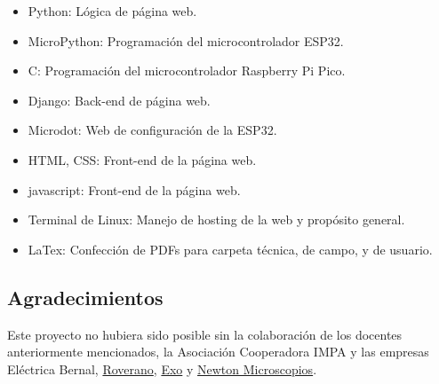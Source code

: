 \begin{itemize}
\item Python: Lógica de página web.
\item MicroPython: Programación del microcontrolador ESP32.
\item C: Programación del microcontrolador Raspberry Pi Pico.
\item Django: Back-end de página web.
\item Microdot: Web de configuración de la ESP32.
\item HTML, CSS: Front-end de la página web.
\item javascript: Front-end de la página web.
\item Terminal de Linux: Manejo de hosting de la web y propósito general.
\item LaTex: Confección de PDFs para carpeta técnica, de campo, y de usuario.
\end{itemize}

\subsection{Agradecimientos}
Este proyecto no hubiera sido posible sin la colaboración de los docentes anteriormente mencionados, la Asociación Cooperadora IMPA y las empresas Eléctrica Bernal, \href{www.bateriasroverano.com.ar}{Roverano}, \href{www.exo.com.ar}{Exo} y \href{www.newtonmicroscopios.com}{Newton Microscopios}.
